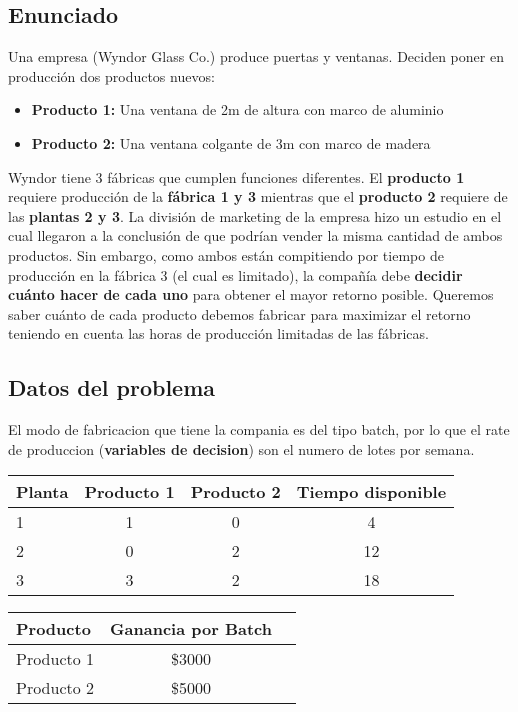 \documentclass[12pt]{article}
\begin{document}
\subsection{Enunciado}

Una empresa (Wyndor Glass Co.) produce puertas y ventanas. Deciden poner en producción dos productos nuevos:
\begin{itemize}
    \item \textbf{Producto 1:} Una ventana de 2m de altura con marco de aluminio
    \item \textbf{Producto 2:} Una ventana colgante de 3m con marco de madera
\end{itemize}

Wyndor tiene 3 fábricas que cumplen funciones diferentes. El \textbf{producto 1} requiere producción de la \textbf{fábrica 1 y 3} mientras que el \textbf{producto 2} requiere de las \textbf{plantas 2 y 3}. La división de marketing de la empresa hizo un estudio en el cual llegaron a la conclusión de que podrían vender la misma cantidad de ambos productos. Sin embargo, como ambos están compitiendo por tiempo de producción en la fábrica 3 (el cual es limitado), la compañía debe \textbf{decidir cuánto hacer de cada uno} para obtener el mayor retorno posible. Queremos saber cuánto de cada producto debemos fabricar para maximizar el retorno teniendo en cuenta las horas de producción limitadas de las fábricas.

\subsection{Datos del problema}

El modo de fabricacion que tiene la compania es del tipo batch, por lo que el rate de produccion (\textbf{variables de decision}) son el numero de lotes por semana.

\begin{table}[H]
    \centering
    \begin{tabular}{l|cc|c}
        \toprule
        \textbf{Planta} & \textbf{Producto 1} & \textbf{Producto 2} & \textbf{Tiempo disponible} \\
        \midrule
        1 & 1 & 0 & 4 \\
        2 & 0 & 2 & 12 \\
        3 & 3 & 2 & 18 \\
        \bottomrule
    \end{tabular}
\end{table}

\begin{table}[H]
    \centering
    \begin{tabular}{l|cc}
        \toprule
        \textbf{Producto} & \textbf{Ganancia por Batch} \\
        \midrule
        Producto 1 & \$3000 \\
        Producto 2 & \$5000 \\
        \bottomrule
    \end{tabular}
\end{table}
\end{document}
